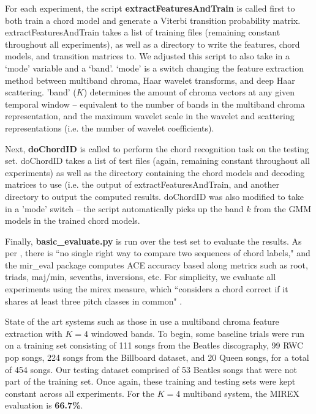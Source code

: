 \documentclass{article}
\begin{document}
For each experiment, the script \textsf{\textbf{extractFeaturesAndTrain}} is called first to both train a chord model and generate a Viterbi transition probability matrix. \textsf{extractFeaturesAndTrain} takes a list of training files (remaining constant throughout all experiments), as well as a directory to write the features, chord models, and transition matrices to. We adjusted this script to also take in a `mode' variable and a `band'. `mode' is a switch changing the feature extraction method between multiband chroma, Haar wavelet transforms, and deep Haar scattering. 'band' ($K$) determines the amount of chroma vectors at any given temporal window -- equivalent to the number of bands in the multiband chroma representation, and the maximum wavelet scale in the wavelet and scattering representations (i.e. the number of wavelet coefficients).
	
	Next, \textsf{\textbf{doChordID}} is called to perform the chord recognition task on the testing set. \textsf{doChordID} takes a list of test files (again, remaining constant throughout all experiments) as well as the directory containing the chord models and decoding matrices to use (i.e. the output of \textsf{extractFeaturesAndTrain}, and another directory to output the computed results. \textsf{doChordID} was also modified to take in a 'mode' switch -- the script automatically picks up the band $k$ from the GMM models in the trained chord models.
	
	Finally, \textsf{\textbf{basic\_evaluate.py}} is run over the test set to evaluate the results. As per \cite{raffel2014mir}, there is ``no single right way to compare two sequences of chord labels," and the \textsf{mir\_eval} package computes ACE accuracy based along metrics such as root, triads, maj/min, sevenths, inversions, etc. For simplicity, we evaluate all experiments using the \textsf{mirex} measure, which ``considers a chord correct if it shares at least three pitch classes in common" \cite{raffel2014mir}.
	
	State of the art systems such as those in \cite{cho2014on} use a multiband chroma feature extraction with $K = 4$ windowed bands. To begin, some baseline trials were run on a training set consisting of 111 songs from the Beatles discography, 99 RWC pop songs, 224 songs from the Billboard dataset, and 20 Queen songs, for a total of 454 songs. Our testing dataset comprised of 53 Beatles songs that were not part of the training set. Once again, these training and testing sets were kept constant across all experiments. For the $K = 4$ multiband system, the \textsf{MIREX} evaluation is \textbf{66.7\%}.
	
\end{document}
